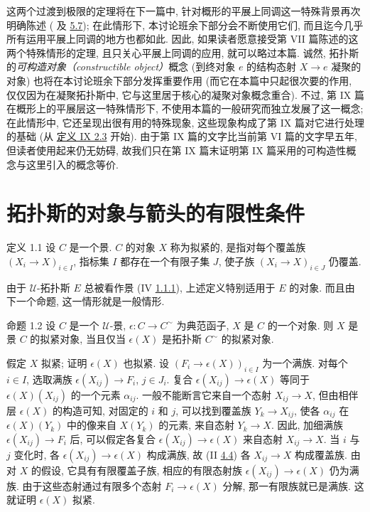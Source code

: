 这两个过渡到极限的定理将在下一篇中,
针对概形的平展上同调这一特殊背景再次明确陈述
( 及 \hyperref[VII.thm5.7]{5.7});
在此情形下, 本讨论班余下部分会不断使用它们,
而且迄今几乎所有运用平展上同调的地方也都如此.
因此, 如果读者愿意接受第 VII 篇陈述的这两个特殊情形的定理,
且只关心平展上同调的应用, 就可以略过本篇.
诚然, 拓扑斯的\emph{可构造对象（constructible object）}概念
(\ie 到终对象 $e$ 的结构态射 $X \to e$ 凝聚的对象)
也将在本讨论班余下部分发挥重要作用
(而它在本篇中只起很次要的作用,
仅仅因为在凝聚拓扑斯中, 它与这里居于核心的凝聚对象概念重合).
不过, 第 IX 篇在概形上的平展层这一特殊情形下,
不使用本篇的一般研究而独立发展了这一概念;
在此情形中, 它还呈现出很有用的特殊现象,
这些现象构成了第 IX 篇对它进行处理的基础
(从 \hyperref[IX.def2.3]{定义 IX 2.3} 开始).
由于第 IX 篇的文字比当前\pageoriginale{}第 VI 篇的文字早五年,
但读者使用起来仍无妨碍,
故我们只在第 IX 篇末证明第 IX 篇采用的可构造性概念与这里引入的概念等价.

\section{拓扑斯的对象与箭头的有限性条件}

\begin{enonce*}{定义 1.1}
设 $C$ 是一个景.
$C$ 的对象 $X$ 称为拟紧的, 是指对每个覆盖族
$(X_i \to X)_{i\in I}$,
指标集 $I$ 都存在一个有限子集 $J$,
使子族 $(X_i \to X)_{i \in J}$ 仍覆盖.
\end{enonce*}

由于 $𝒰$-拓扑斯 $E$ 总被看作景
(IV \hyperref[IV.subsubsec1.1.1]{1.1.1}),
上述定义特别适用于 $E$ 的对象.
而且由下一个命题, 这一情形就是一般情形.

\begin{enonce*}{命题 1.2}
设 $C$ 是一个 $𝒰$-景,
$\epsilon : C \to C^{\sim}$ 为典范函子,
$X$ 是 $C$ 的一个对象.
则 $X$ 是景 $C$ 的拟紧对象,
当且仅当 $\epsilon(X)$ 是拓扑斯 $C^{\sim}$ 的拟紧对象.
\end{enonce*}

假定 $X$ 拟紧; 证明 $\epsilon(X)$ 也拟紧.
设 $(F_i \to \epsilon(X))_{i \in I}$ 为一个满族.
对每个 $i \in I$, 选取满族
$\epsilon(X_{ij}) \to F_i$, $j \in J_i$.
复合 $\epsilon(X_{ij}) \to \epsilon(X)$
等同于 $\epsilon(X)(X_{ij})$ 的一个元素 $\alpha_{ij}$.
一般不能断言它来自一个态射 $X_{ij} \to X$,
但由相伴层 $\epsilon(X)$ 的构造可知,
对固定的 $i$ 和 $j$, 可以找到覆盖族 $Y_k \to X_{ij}$,
使各 $\alpha_{ij}$ 在 $\epsilon(X)(Y_k)$ 中的像来自 $X(Y_k)$ 的元素,
\ie 来自态射 $Y_k \to X$.
因此, 加细满族 $\epsilon(X_{ij}) \to F_i$ 后,
可以假定各复合 $\epsilon(X_{ij}) \to \epsilon(X)$ 来自态射
$X_{ij} \to X$.\pageoriginale{}
当 $i$ 与 $j$ 变化时,
各 $\epsilon(X_{ij}) \to \epsilon(X)$ 构成满族,
故 (II \hyperref[II.theo4.4]{4.4}) 各 $X_{ij} \to X$ 构成覆盖族.
由对 $X$ 的假设, 它具有有限覆盖子族,
相应的有限态射族 $\epsilon(X_{ij}) \to \epsilon(X)$ 仍为满族.
由于这些态射通过有限多个态射 $F_i \to \epsilon(X)$ 分解,
那一有限族就已是满族.
这就证明 $\epsilon(X)$ 拟紧.

